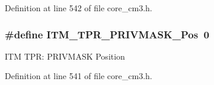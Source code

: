\-Definition at line 542 of file core\-\_\-cm3.\-h.

\hypertarget{group___c_m_s_i_s___i_t_m_ga7abe5e590d1611599df87a1884a352e8}{
\subsubsection[{\-I\-T\-M\-\_\-\-T\-P\-R\-\_\-\-P\-R\-I\-V\-M\-A\-S\-K\-\_\-\-Pos}]{\setlength{\rightskip}{0pt plus 5cm}\#define {\bf \-I\-T\-M\-\_\-\-T\-P\-R\-\_\-\-P\-R\-I\-V\-M\-A\-S\-K\-\_\-\-Pos}~0}}\label{group___c_m_s_i_s___i_t_m_ga7abe5e590d1611599df87a1884a352e8}
\-I\-T\-M \-T\-P\-R\-: \-P\-R\-I\-V\-M\-A\-S\-K \-Position 

\-Definition at line 541 of file core\-\_\-cm3.\-h.

